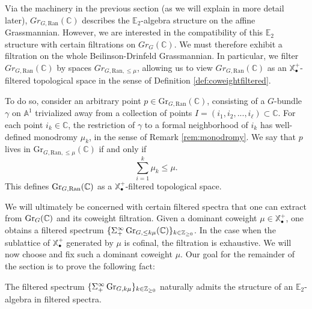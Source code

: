 Via the machinery in the previous section (as we will explain in more detail later), $Gr_{G,\text{Ran}}(\mathbb{C})$ describes the $\mathbb{E}_2$-algebra structure on the affine Grassmannian.  However, we are interested in the compatibility of this $\mathbb{E}_2$ structure with certain filtrations on $Gr_G(\mathbb{C})$.  We must therefore exhibit a filtration on the whole Beilinson-Drinfeld Grassmannian.  In particular, we filter $Gr_{G,\text{Ran}}(\mathbb{C})$ by spaces $Gr_{G,\text{Ran},\le \mu}$, allowing us to view $Gr_{G,\text{Ran}}(\mathbb{C})$ as an $\mathbb{X}_{\bullet}^+$-filtered topological space in the sense of Definition \ref{def:coweightfiltered}.  

To do so, consider an arbitrary point $p \in \text{Gr}_{G,\text{Ran}}(\mathbb{C})$, consisting of a $G$-bundle $\gamma$ on $\mathbb{A}^1$ trivialized away from a collection of points $I=(i_1,i_2,...,i_\ell) \subset \mathbb{C}$.  For each point $i_k \in \mathbb{C}$, the restriction of $\gamma$ to a formal neighborhood of $i_k$ has well-defined monodromy $\mu_k$, in the sense of Remark \ref{rem:monodromy}.  We say that $p$ lives in $\text{Gr}_{G,\text{Ran},\le \mu}(\mathbb{C})$ if and only if
$$\sum_{i=1}^{k} \mu_k \le \mu.$$  This defines $\operatorname{\mathrm{Gr}}_{G,\operatorname{\mathrm{Ran}}}(\mathbb{C})$ as a $\mathbb{X}^+_{\bullet}$-filtered topological space.

We will ultimately be concerned with certain filtered spectra that one can extract from $\operatorname{\mathrm{Gr}}_{G}(\mathbb{C})$ and its coweight filtration.  Given a dominant coweight $\mu \in \mathbb{X}^+_{\bullet}$, one obtains a filtered spectrum $ \{ \Sigma^{\infty}_+ \operatorname{\mathrm{Gr}}_{G,\leq k\mu}(\mathbb{C})\}_{k\in \mathbb{Z}_{\geq 0}}$. In the case when the sublattice of $\mathbb{X}^+_{\bullet}$ generated by $\mu$ is cofinal, the filtration is exhaustive.  We will now choose and fix such a dominant coweight $\mu$.  Our goal for the remainder of the section is to prove the following fact:

\begin{prop}\label{prop:schubertE2}
The filtered spectrum $\{\Sigma^{\infty}_+ \operatorname{\mathrm{Gr}}_{G, k \mu} \}_{k\in \mathbb{Z}_{\geq 0}}$ naturally admits the structure of an $\mathbb{E}_2$-algebra in filtered spectra.
\end{prop}

